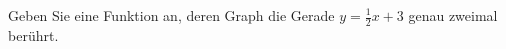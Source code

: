\item Geben Sie eine Funktion an, deren Graph die Gerade $y=\frac{1}{2}x+3$ genau zweimal berührt. 
